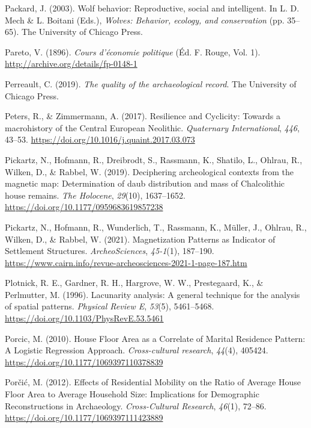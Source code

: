 \documentclass[
  12pt,
]{book}
\newlength{\cslhangindent}
\newlength{\cslentryspacingunit} %
\newenvironment{CSLReferences}[2] %
 {%
  \setlength{\parindent}{0pt}
  \ifodd #1
  \let\oldpar\par
  \def\par{\hangindent=\cslhangindent\oldpar}
  \fi
  \setlength{\parskip}{#2\cslentryspacingunit}
 }%
 {}
\begin{document}
\begin{CSLReferences}{1}{0}
\leavevmode{}%
Packard, J. (2003). Wolf behavior: Reproductive, social and intelligent. In L. D. Mech \& L. Boitani (Eds.), \emph{Wolves: Behavior, ecology, and conservation} (pp. 35--65). {The University of Chicago Press}.

\leavevmode{}%
Pareto, V. (1896). \emph{Cours d'économie politique} (Éd. F. Rouge, Vol. 1). \url{http://archive.org/details/fp-0148-1}

\leavevmode{}%
Perreault, C. (2019). \emph{The quality of the archaeological record}. The University of Chicago Press.

\leavevmode{}%
Peters, R., \& Zimmermann, A. (2017). Resilience and Cyclicity: Towards a macrohistory of the Central European Neolithic. \emph{Quaternary International}, \emph{446}, 43--53. \url{https://doi.org/10.1016/j.quaint.2017.03.073}

\leavevmode{}%
Pickartz, N., Hofmann, R., Dreibrodt, S., Rassmann, K., Shatilo, L., Ohlrau, R., Wilken, D., \& Rabbel, W. (2019). Deciphering archeological contexts from the magnetic map: Determination of daub distribution and mass of Chalcolithic house remains. \emph{The Holocene}, \emph{29}(10), 1637--1652. \url{https://doi.org/10.1177/0959683619857238}

\leavevmode{}%
Pickartz, N., Hofmann, R., Wunderlich, T., Rassmann, K., Müller, J., Ohlrau, R., Wilken, D., \& Rabbel, W. (2021). Magnetization Patterns as Indicator of Settlement Structures. \emph{ArcheoSciences}, \emph{45-1}(1), 187--190. \url{https://www.cairn.info/revue-archeosciences-2021-1-page-187.htm}

\leavevmode{}%
Plotnick, R. E., Gardner, R. H., Hargrove, W. W., Prestegaard, K., \& Perlmutter, M. (1996). Lacunarity analysis: A general technique for the analysis of spatial patterns. \emph{Physical Review E}, \emph{53}(5), 5461--5468. \url{https://doi.org/10.1103/PhysRevE.53.5461}

\leavevmode{}%
Porcic, M. (2010). House Floor Area as a Correlate of Marital Residence Pattern: A Logistic Regression Approach. \emph{Cross-cultural research}, \emph{44}(4), 405424. \url{https://doi.org/10.1177/1069397110378839}

\leavevmode{}%
Porčić, M. (2012). Effects of Residential Mobility on the Ratio of Average House Floor Area to Average Household Size: Implications for Demographic Reconstructions in Archaeology. \emph{Cross-Cultural Research}, \emph{46}(1), 72--86. \url{https://doi.org/10.1177/1069397111423889}


\end{CSLReferences}
\end{document}
